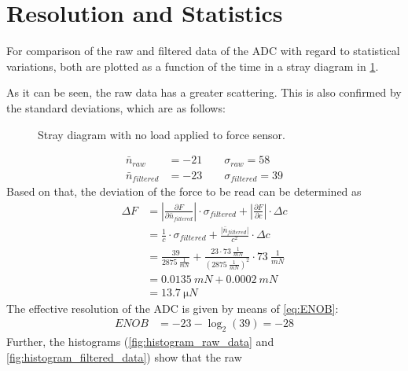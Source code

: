     \section{Resolution and Statistics}
        For comparison of the raw and filtered data of the ADC with regard to statistical variations, both are
        plotted as a function of the time in a stray diagram in \cref{fig:adc_result}.\par
        As it can be seen, the raw data has a greater scattering. This is also confirmed by the standard deviations, which are as follows:
        \begin{figure}[h]
            \centering
            
            \caption[Stray diagram with no load applied to force sensor]{Stray diagram with no load applied to force sensor.}
            \label{fig:adc_result}
        \end{figure}
        \begin{align*}
            \bar{n}_{raw}       &=-21 \qquad \sigma_{raw}=58\\
            \bar{n}_{filtered}  &=-23 \qquad \sigma_{filtered}=39
        \end{align*}
        Based on that, the deviation of the force to be read can be determined as
        \begin{align}
            \Delta F    &=\left| \frac{\partial F}{\partial \bar{n}_{filtered}} \right| \cdot \sigma_{filtered} + \left| \frac{\partial F}{\partial c} \right| \cdot \Delta c \nonumber \\
                        &=\frac{1}{c} \cdot \sigma_{filtered} + \frac{\left|\bar{n}_{filtered}\right|}{c^2} \cdot \Delta c \nonumber \\
                        &=\frac{39}{\SI{2875}{\frac{1}{mN}}} + \frac{23 \cdot \SI{73}{\frac{1}{mN}}}{(\SI{2875}{\frac{1}{mN}})^2} \cdot \SI{73}{\frac{1}{mN}} \nonumber \\
                        &=\SI{0.0135}{mN}+\SI{0.0002}{mN} \nonumber \\
                        &=\SI{13.7}{\micro N}
        \end{align}
        The effective resolution of the ADC is given by means of \cref{eq:ENOB}:
        \begin{align*}
            ENOB&=-23-\log_2(39)=-28
        \end{align*}
        Further, the histograms (\cref{fig:histogram_raw_data} and \cref{fig:histogram_filtered_data}) show that the raw
